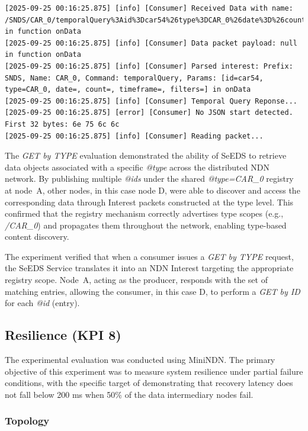 \documentclass{article}
\begin{document}
\begin{lstlisting}[language=log, caption={D's log after receiving the registry payload, which are the \textit{@ids}, and performing a \emph{GET by ID} for each},label={lst:get-by-id-after-get-by-type-d}]
[2025-09-25 00:16:25.875] [info] [Consumer] Received Data with name: /SNDS/CAR_0/temporalQuery%3Aid%3Dcar54%26type%3DCAR_0%26date%3D%26count%3D%26timeframe%3D%26filters%3D in function onData
[2025-09-25 00:16:25.875] [info] [Consumer] Data packet payload: null in function onData
[2025-09-25 00:16:25.875] [info] [Consumer] Parsed interest: Prefix: SNDS, Name: CAR_0, Command: temporalQuery, Params: [id=car54, type=CAR_0, date=, count=, timeframe=, filters=] in onData
[2025-09-25 00:16:25.875] [info] [Consumer] Temporal Query Reponse...
[2025-09-25 00:16:25.875] [error] [Consumer] No JSON start detected. First 32 bytes: 6e 75 6c 6c 
[2025-09-25 00:16:25.875] [info] [Consumer] Reading packet...
\end{lstlisting}

The \textit{GET by TYPE} evaluation demonstrated the ability of SeEDS to retrieve data objects associated with a specific \textit{@type} across the distributed NDN network. By publishing multiple \textit{@ids} under the shared \textit{@type=CAR\_0} registry at node~A, other nodes, in this case node D, were able to discover and access the corresponding data through Interest packets constructed at the type level. This confirmed that the registry mechanism correctly advertises type scopes (e.g., \textit{/CAR\_0}) and propagates them throughout the network, enabling type-based content discovery.

The experiment verified that when a consumer issues a \textit{GET by TYPE} request, the SeEDS Service translates it into an NDN Interest targeting the appropriate registry scope. Node~A, acting as the producer, responds with the set of matching entries, allowing the consumer, in this case D, to perform a \emph{GET by ID} for each \textit{@id} (entry).

\subsection{Resilience (KPI 8)}

The experimental evaluation was conducted using MiniNDN. The primary objective of this experiment was to measure system resilience under partial failure conditions, with the specific target of demonstrating that recovery latency does not fall below 200 ms when 50\% of the data intermediary nodes fail.

\subsubsection{Topology}
\end{document}
